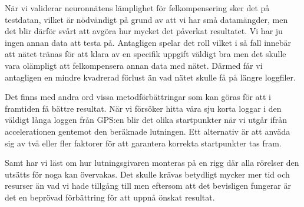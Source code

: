 {När vi validerar neuronnätens lämplighet för felkompensering sker det på testdatan,
vilket är nödvändigt på grund av att vi har små datamängder, men det blir därför
svårt att avgöra hur mycket det påverkat resultatet.
Vi har ju ingen annan data att testa på.
Antagligen spelar det roll vilket i så fall innebär att nätet tränas för att
klara av en specifik uppgift väldigt bra men det skulle vara olämpligt att
felkompensera annan data med nätet.
Därmed får vi antagligen en mindre kvadrerad förlust än vad nätet skulle få på
längre loggfiler.

Det finns med andra ord vissa metodförbättringar som kan göras för att i
framtiden få bättre resultat.
När vi försöker hitta våra sju korta loggar i den väldigt långa loggen från
GPS:en blir det olika startpunkter när vi utgår ifrån accelerationen
gentemot den beräknade lutningen.
Ett alternativ är att anväda sig av två eller fler faktorer för
att garantera korrekta startpunkter tas fram.

Samt har vi läst om hur lutningsgivaren monteras på en rigg där alla rörelser
den utsätts för noga kan övervakas. Det skulle krävas betydligt mycker mer tid
och resurser än vad vi hade tillgång till men eftersom att det bevisligen
fungerar är det en beprövad förbättring för att uppnå önskat resultat.
}

